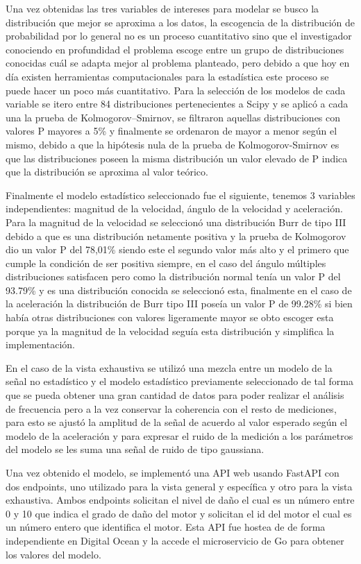 Una vez obtenidas las tres variables de intereses para modelar se busco la
distribución que mejor se aproxima a los datos, la escogencia de la
distribución de probabilidad por lo general no es un proceso cuantitativo sino
que el investigador conociendo en profundidad el problema escoge entre un grupo
de distribuciones conocidas cuál se adapta mejor al problema planteado, pero
debido a que hoy en día existen herramientas computacionales para la
estadística este proceso se puede hacer un poco más cuantitativo. Para la
selección de los modelos de cada variable se itero entre 84 distribuciones
pertenecientes a Scipy y se aplicó a cada una la prueba de Kolmogorov–Smirnov,
se filtraron aquellas distribuciones con valores P mayores a 5\% y finalmente se
ordenaron de mayor a menor según el mismo, debido a que la hipótesis nula de la
prueba de Kolmogorov-Smirnov es que las distribuciones poseen la misma
distribución un valor elevado de P indica que la distribución se aproxima al
valor teórico.

Finalmente el modelo estadístico seleccionado fue el siguiente, tenemos 3
variables independientes: magnitud de la velocidad, ángulo de la velocidad y
aceleración. Para la magnitud de la velocidad se seleccionó una distribución
Burr de tipo III debido a que es una distribución netamente positiva y la
prueba de Kolmogorov dio un valor P del 78,01\% siendo este el segundo valor más
alto y el primero que cumple la condición de ser positiva siempre, en el caso
del ángulo múltiples distribuciones satisfacen pero como la distribución normal
tenía un valor P del 93.79\% y es una distribución conocida se seleccionó esta,
finalmente en el caso de la aceleración la distribución de Burr tipo III poseía
un valor P de 99.28\% si bien había otras distribuciones con valores ligeramente
mayor se obto escoger esta porque ya la magnitud de la velocidad seguía esta
distribución y simplifica la implementación.

En el caso de la vista exhaustiva se utilizó una mezcla entre un modelo de la
señal no estadístico y el modelo estadístico previamente seleccionado de tal
forma que se pueda obtener una gran cantidad de datos para poder realizar el
análisis de frecuencia pero a la vez conservar la coherencia con el resto de
mediciones, para esto se ajustó la amplitud de la señal de acuerdo al valor
esperado según el modelo de la aceleración y para expresar el ruido de la
medición a los parámetros del modelo se les suma una señal de ruido de tipo
gaussiana.

Una vez obtenido el modelo, se implementó una API web usando FastAPI con dos
endpoints, uno utilizado para la vista general y específica y otro para la
vista exhaustiva. Ambos endpoints solicitan el nivel de daño el cual es un
número entre 0 y 10 que indica el grado de daño del motor y solicitan el id del
motor el cual es un número entero  que identifica el motor. Esta API fue hostea
de de forma independiente en Digital Ocean y la accede el microservicio de Go
para obtener los valores del modelo.
